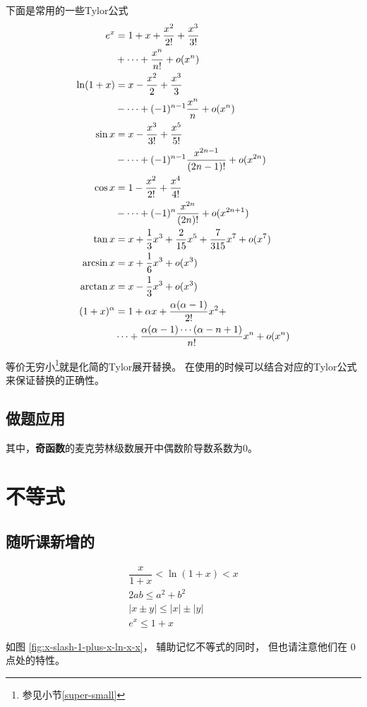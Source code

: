 下面是常用的一些Tylor公式
\begin{align}
    \label{eq:useful-tylor-expandations}
	\notag e^x&=1+x+\frac{x^2}{2!}+\frac{x^3}{3!} \\ &+\cdots+\frac{x^n}{n!}+o(x^n)\\
	\notag \ln(1+x)&=x-\frac{x^2}{2}+\frac{x^3}{3}\\ &-\cdots+(-1)^{n-1}\frac{x^n}{n}+o(x^n)\\
	\notag \sin x&=x-\frac{x^3}{3!}+\frac{x^5}{5!}\\ &-\cdots+(-1)^{n-1}\frac{x^{2n-1}}{(2n-1)!}+o(x^{2n})\\
	\notag \cos x&=1-\frac{x^2}{2!}+\frac{x^4}{4!}\\ &-\cdots+(-1)^n\frac{x^{2n}}{(2n)!}+o(x^{2n+1})\\
           \tan x&=x+\frac{1}{3}x^3 + \frac{2}{15}x^5 + \frac{7}{315}x^7 + o(x^7)\\
           \arcsin x&= x + \frac{1}{6} x^3 + o(x^3) \\
           \arctan x&= x - \frac{1}{3} x^3 + o(x^3) \\
	\notag (1+x)^\alpha&=1+\alpha x+\frac{\alpha(\alpha-1)}{2!}x^2+ \\  &\cdots+\frac{\alpha(\alpha-1)\cdots(\alpha-n+1)}{n!}x^n+o(x^n)
\end{align}

等价无穷小\footnote{参见小节\ref{super-small}}就是化简的Tylor展开替换。
在使用的时候可以结合对应的Tylor公式来保证替换的正确性。

\subsection{做题应用} \label{tylor-app}

其中，\textbf{奇函数}的麦克劳林级数展开中偶数阶导数系数为0。

\section{不等式} \label{inequlity}

\subsection{随听课新增的}

\begin{lemma}
    \begin{gather*}
        \dfrac{x}{1+x} < \ln (1+x) < x \\
        2ab \leq a^2 + b^2 \\
        |x\pm y| \leq |x| \pm |y| \\
        e^x \leq 1 + x
    \end{gather*}
\end{lemma}
如图 \ref{fig:x-slash-1-plus-x-ln-x-x}，
辅助记忆不等式的同时，
但也请注意他们在 $0$ 点处的特性。


